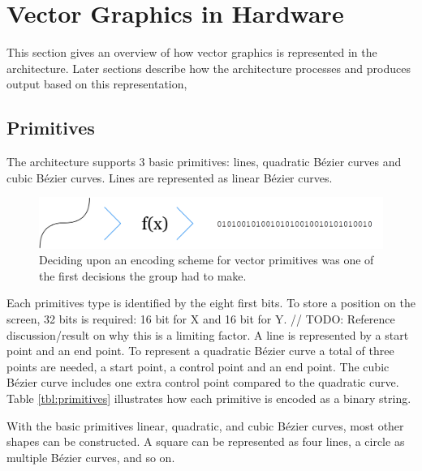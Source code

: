 \section{Vector Graphics in Hardware}

This section gives an overview of how vector graphics is represented in the \vthreek architecture.
Later sections describe how the architecture processes and produces output based on this representation, 

\subsection{Primitives}

The \vthreek architecture supports 3 basic primitives: lines, quadratic Bézier curves and cubic Bézier curves.
Lines are represented as linear Bézier curves.

\begin{figure}[h!]
    \centering
    \includegraphics[width=0.8\linewidth]{images/primitive_encoding.png}
    \caption{Deciding upon an encoding scheme for vector primitives was one of the first decisions the group had to make.}
    \label{fig:primitive_encoding}
\end{figure}

Each primitives type is identified by the eight first bits.
To store a position on the screen, 32 bits is required: 16 bit for X and 16 bit for Y. // TODO: Reference discussion/result on why this is a limiting factor.
A line is represented by a start point and an end point.
To represent a quadratic Bézier curve a total of three points are needed, a start point, a control point and an end point.
The cubic Bézier curve includes one extra control point compared to the quadratic curve.
Table \ref{tbl:primitives} illustrates how each primitive is encoded as a binary string.

With the basic primitives linear, quadratic, and cubic Bézier curves, most other shapes can be constructed.
A square can be represented as four lines, a circle as multiple Bézier curves, and so on.

